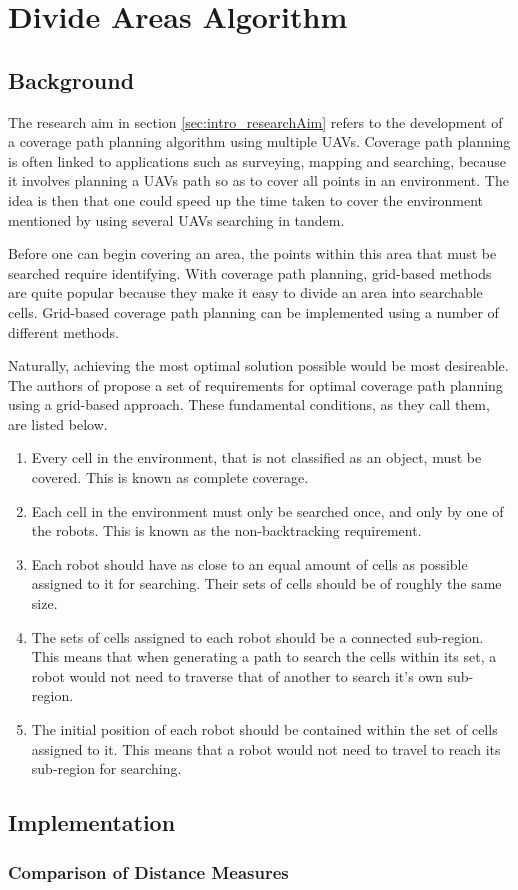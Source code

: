 \chapter{Divide Areas Algorithm}
\label{chp:DARP}

\section{Background}
The research aim in section \ref{sec:intro_researchAim} refers to the development of a coverage path planning algorithm using multiple UAVs. Coverage path planning is often linked to applications such as surveying, mapping and searching, because it involves planning a UAVs path so as to cover all points in an environment. The idea is then that one could speed up the time taken to cover the environment mentioned by using several UAVs searching in tandem.

Before one can begin covering an area, the points within this area that must be searched require identifying. With coverage path planning, grid-based methods are quite popular because they make it easy to divide an area into searchable cells.
Grid-based coverage path planning can be implemented using a number of different methods. 

Naturally, achieving the most optimal solution possible would be most desireable. The authors of \cite{DARP2017} propose a set of requirements for optimal coverage path planning using a grid-based approach. These fundamental conditions, as they call them, are listed below.

\begin{enumerate}
	\item Every cell in the environment, that is not classified as an object, must be covered. This is known as complete coverage.
	\item Each cell in the environment must only be searched once, and only by one of the robots. This is known as the non-backtracking requirement.
	\item Each robot should have as close to an equal amount of cells as possible assigned to it for searching. Their sets of cells should be of roughly the same size.
	\item The sets of cells assigned to each robot should be a connected sub-region. This means that when generating a path to search the cells within its set, a robot would not need to traverse that of another to search it's own sub-region.
	\item The initial position of each robot should be contained within the set of cells assigned to it. This means that a robot would not need to travel to reach its sub-region for searching.
\end{enumerate}

\section{Implementation}
\subsection{Comparison of Distance Measures}
